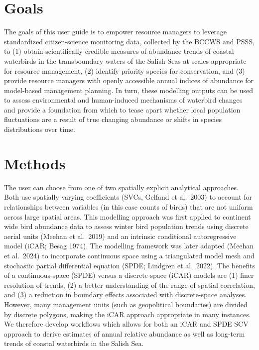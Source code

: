 \documentclass[
  letterpaper,
  DIV=11,
  numbers=noendperiod]{scrreprt}
\begin{document}
\section{Goals}\label{1.1Intro}

The goals of this user guide is to empower resource managers to leverage
standardized citizen-science monitoring data, collected by the BCCWS and
PSSS, to (1) obtain scientifically credible measures of abundance trends
of coastal waterbirds in the transboundary waters of the Salish Seas at
scales appropriate for resource management, (2) identify priority
species for conservation, and (3) provide resource managers with openly
accessible annual indices of abundance for model-based management
planning. In turn, these modelling outputs can be used to assess
environmental and human-induced mechanisms of waterbird changes and
provide a foundation from which to tease apart whether local population
fluctuations are a result of true changing abundance or shifts in
species distributions over time.

\section{Methods}\label{1.2Intro}

The user can choose from one of two spatially explicit analytical
approaches. Both use spatially varying coefficients (SVCs, Gelfand et
al.~2003) to account for relationships between variables (in this case
counts of birds) that are not uniform across large spatial areas. This
modelling approach was first applied to continent wide bird abundance
data to assess winter bird population trends using discrete aerial units
(Meehan et al.~2019) and an intrinsic conditional autoregressive model
(iCAR; Besag 1974). The modelling framework was later adapted (Meehan et
al.~2024) to incorporate continuous space using a triangulated model
mesh and stochastic partial differential equation (SPDE; Lindgren et
al.~2022). The benefits of a continuous-space (SPDE) versus a
discrete-space (iCAR) models are (1) finer resolution of trends, (2) a
better understanding of the range of spatial correlation, and (3) a
reduction in boundary effects associated with discrete-space analyses.
However, many management units (such as geopolitical boundaries) are
divided by discrete polygons, making the iCAR approach appropriate in
many instances. We therefore develop workflows which allows for both an
iCAR and SPDE SCV approach to derive estimates of annual relative
abundance as well as long-term trends of coastal waterbirds in the
Salish Sea.
\end{document}
